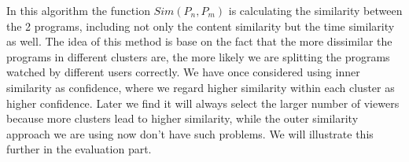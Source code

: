 In this algorithm the function $Sim(P_n, P_m)$ is calculating the similarity between the 2 programs, including not only the content similarity
but the time similarity as well. The idea of this method is base on the fact that the more dissimilar the programs in different clusters are, the
more likely we are splitting the programs watched by different users correctly. We have once considered using inner similarity as confidence, where we
regard higher similarity within each cluster as higher confidence. Later we find it will always select the larger number of viewers because more
clusters lead to higher similarity, while the outer similarity approach we are using now don't have such problems. We will illustrate this further 
in the evaluation part.
